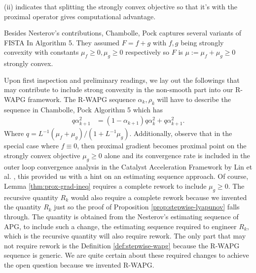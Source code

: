 \documentclass[12pt]{article}
\begin{document}
            (ii) indicates that splitting the strongly convex objective so that it's with the proximal operator gives computational advantage. 
            \par
            Besides Nesterov's contributions, Chambolle, Pock \cite{chambolle_introduction_2016} captures several variants of FISTA In Algorithm 5.
            They assumed $F = f + g$ with $f, g$ being strongly convexity with constants $\mu_f \ge 0, \mu_g \ge 0$ respectively so $F$ is $\mu := \mu_f + \mu_g \ge 0$ strongly convex. 
            \par
            Upon first inspection and preliminary readings, we lay out the followings that may contribute to include strong convexity in the non-smooth part into our R-WAPG framework. 
            The R-WAPG sequence $\alpha_k, \rho_k$ will have to describe the sequence in Chambolle, Pock \cite{chambolle_introduction_2016} Algorithm 5 which has 
            \begin{align*}
                q \alpha_{k + 1}^2 &= (1 - \alpha_{k + 1})q\alpha_k^2 + q \alpha_{k + 1}^2. 
            \end{align*}
            Where $q = L^{-1}(\mu_f + \mu_g)/(1 + L^{-1}\mu_g)$. 
            Additionally, observe that in the special case where $f \equiv 0$, then proximal gradient becomes proximal point on the strongly convex objective $\mu_g \ge0$ alone and its convergence rate is included in the outer loop convergence analysis in the Catalyst Acceleration Framework by Lin et al. \cite{lin_universal_2015}, this provided us with a hint on an estimating sequence approach. 
            Of course, Lemma \ref{thm:prox-grad-ineq} requires a complete rework to include $\mu_g \ge0$. 
            The recursive quantity $R_k$ would also require a complete rework because we invented the quantity $R_k$ just so the proof of Proposition \ref{prop:stepwise-lyapunov} falls through. 
            The quantity is obtained from the Nesterov's estimating sequence of APG, to include such a change, the estimating sequence required to engineer $R_k$, which is the recursive quantity will also require rework. 
            The only part that may not require rework is the Definition \ref{def:stepwise-wapg} because the R-WAPG sequence is generic. 
            We are quite certain about these required changes to achieve the open question because we invented R-WAPG. 
            
\end{document}
